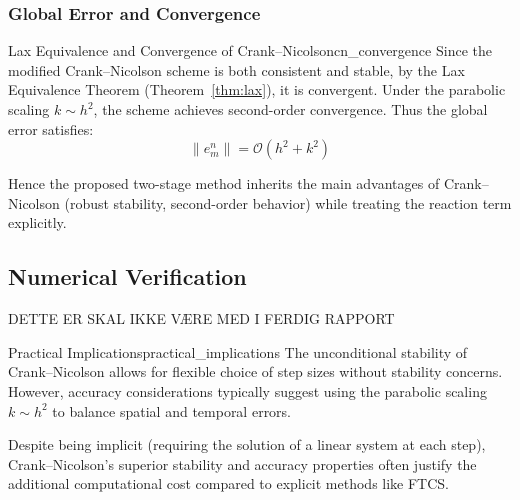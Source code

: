 \subsubsection{Global Error and Convergence}

\begin{theorem}{Lax Equivalence and Convergence of Crank--Nicolson}{cn_convergence}
  Since the modified Crank--Nicolson scheme is both consistent and stable, by the Lax Equivalence Theorem 
  (Theorem~\ref{thm:lax}), it is convergent. Under the parabolic scaling $k \sim h^2$, the scheme achieves 
  second-order convergence. Thus the global error satisfies:
  \[
    \|e_m^n\| = \mathcal{O}\!\left(h^2 + k^2\right)
  \]
  
\end{theorem}

Hence the proposed two-stage method inherits the main advantages of Crank–Nicolson
(robust stability, second-order behavior) while treating the reaction term explicitly.


\subsection{Numerical Verification}

DETTE ER SKAL IKKE VÆRE MED I FERDIG RAPPORT
\begin{remark}{Practical Implications}{practical_implications}
    The unconditional stability of Crank--Nicolson allows for flexible choice of step sizes without stability 
    concerns. However, accuracy considerations typically suggest using the parabolic scaling $k \sim h^2$ to 
    balance spatial and temporal errors.
  
    Despite being implicit (requiring the solution of a linear system at each step), Crank--Nicolson's superior 
    stability and accuracy properties often justify the additional computational cost compared to explicit 
    methods like FTCS.
  \end{remark}
